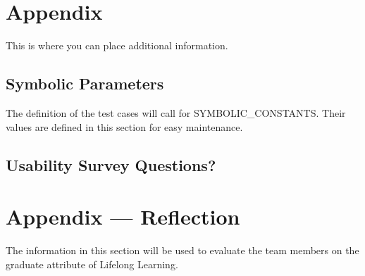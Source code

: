 \documentclass[12pt, titlepage]{article}
\begin{document}
				




\newpage

\section{Appendix}

This is where you can place additional information.

\subsection{Symbolic Parameters}

The definition of the test cases will call for SYMBOLIC\_CONSTANTS.
Their values are defined in this section for easy maintenance.

\subsection{Usability Survey Questions?}


\newpage{}
\section*{Appendix --- Reflection}


The information in this section will be used to evaluate the team members on the
graduate attribute of Lifelong Learning.


\end{document}
